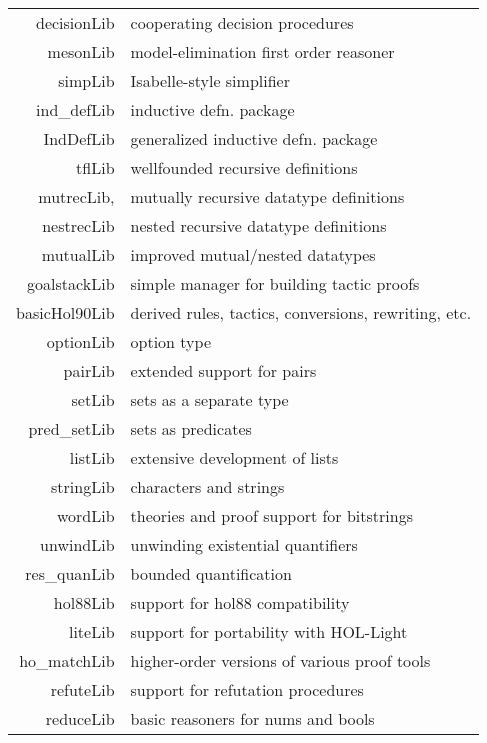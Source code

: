 \documentclass[12pt,fleqn,a4paper]{report}
\begin{document}
\begin{table}
\begin{center}
\begin{tabular}{|r|l|} \hline
    decisionLib     & cooperating decision procedures \\
    mesonLib        & model-elimination first order reasoner \\
    simpLib         & Isabelle-style simplifier \\
    ind\_defLib     & inductive defn. package \\
    IndDefLib       & generalized inductive defn. package \\
    tflLib          & wellfounded recursive definitions \\
    mutrecLib,      & mutually recursive datatype definitions \\
    nestrecLib      & nested  recursive datatype definitions \\
    mutualLib       & improved mutual/nested datatypes  \\
    goalstackLib    & simple manager for building tactic proofs \\
    basicHol90Lib   & derived rules, tactics, conversions, rewriting, etc. \\
    optionLib       & option type \\
    pairLib         & extended support for pairs \\
    setLib          & sets as a separate type \\
    pred\_setLib    & sets as predicates \\
    listLib         & extensive development of lists \\
    stringLib       & characters and strings \\
    wordLib         & theories and proof support for bitstrings \\
    unwindLib       & unwinding existential quantifiers \\
    res\_quanLib    & bounded quantification \\
    hol88Lib        & support for hol88 compatibility \\
    liteLib         & support for portability with HOL-Light \\
    ho\_matchLib    & higher-order versions of various proof tools \\
    refuteLib       & support for refutation procedures \\
    reduceLib       & basic reasoners for nums and bools \\

\end{tabular}
\end{center}
\end{table}
\end{document}
